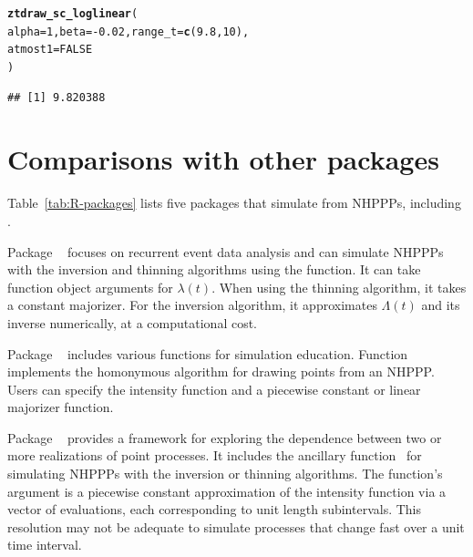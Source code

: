 \documentclass[article,nojss]{jss}\usepackage[]{graphicx}\usepackage[]{xcolor}
\makeatletter
\newcommand{\hlnum}[1]{\textcolor[rgb]{0.686,0.059,0.569}{#1}}%
\newcommand{\hlopt}[1]{\textcolor[rgb]{0,0,0}{#1}}%
\newcommand{\hlstd}[1]{\textcolor[rgb]{0.345,0.345,0.345}{#1}}%
\newcommand{\hlkwc}[1]{\textcolor[rgb]{0.333,0.667,0.333}{#1}}%
\newcommand{\hlkwd}[1]{\textcolor[rgb]{0.737,0.353,0.396}{\textbf{#1}}}%
\newenvironment{kframe}{%
 \def\at@end@of@kframe{}%
 \ifinner\ifhmode%
  \def\at@end@of@kframe{\end{minipage}}%
  \begin{minipage}{\columnwidth}%
 \fi\fi%
 \def\FrameCommand##1{\hskip\@totalleftmargin \hskip-\fboxsep
 \colorbox{shadecolor}{##1}\hskip-\fboxsep
     \hskip-\linewidth \hskip-\@totalleftmargin \hskip\columnwidth}%
 \MakeFramed {\advance\hsize-\width
   \@totalleftmargin\z@ \linewidth\hsize
   \@setminipage}}%
 {\par\unskip\endMakeFramed%
 \at@end@of@kframe}
\newenvironment{knitrout}{}{} %
\newcommand{\fct}[1]{\code{#1()}}
\makeatother
\begin{document}
\begin{knitrout}
\color{fgcolor}\begin{kframe}
\begin{alltt}
\hlkwd{ztdraw_sc_loglinear}\hlstd{(}
  \hlkwc{alpha} \hlstd{=} \hlnum{1}\hlstd{,} \hlkwc{beta} \hlstd{=} \hlopt{-}\hlnum{0.02}\hlstd{,} \hlkwc{range_t} \hlstd{=} \hlkwd{c}\hlstd{(}\hlnum{9.8}\hlstd{,} \hlnum{10}\hlstd{),}
  \hlkwc{atmost1} \hlstd{=} \hlnum{FALSE}
\hlstd{)}
\end{alltt}
\begin{verbatim}
## [1] 9.820388
\end{verbatim}
\end{kframe}
\end{knitrout}


\section[Comparisons with other R packages]{Comparisons with other  packages}\label{sec:other-R-packages}

Table~\ref{tab:R-packages} lists five  packages that simulate from NHPPPs, including .

Package ~\citep{reda-package} focuses on recurrent event data analysis and can simulate NHPPPs with the inversion and thinning algorithms using the \fct{simEvent} function. It can take function object arguments for $\lambda(t)$. When using the thinning algorithm, it takes a constant majorizer. For the inversion algorithm, it approximates $\Lambda(t)$ and its inverse numerically, at a computational cost.

Package ~\citep{simEd-package} includes various functions for simulation education. Function \fct{thinning} implements the homonymous algorithm for drawing points from an NHPPP. Users can specify the intensity function and a piecewise constant or linear majorizer function.

Package ~\citep{IndTestPP-package} provides a framework for exploring the dependence between two or more realizations of point processes. It includes the ancillary function~\fct{simNHPc} for simulating NHPPPs with the inversion or thinning algorithms. The function's argument is a piecewise constant approximation of the intensity function via a vector of evaluations, each corresponding to unit length subintervals. This resolution may not be adequate to simulate processes that change fast over a unit time interval.
\end{document}
